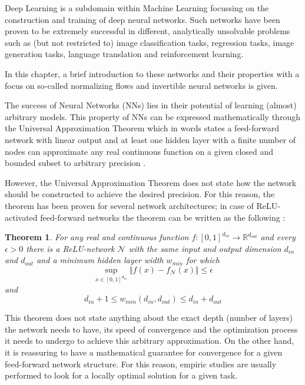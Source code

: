 \label{sec:deeplearning}

Deep Learning is a subdomain within Machine Learning focussing on the construction and training of deep neural networks. Such networks have been proven to be extremely successful in different, analytically unsolvable problems such as (but not restricted to) image classification tasks, regression tasks, image generation tasks, language translation and reinforcement learning.

In this chapter, a brief introduction to these networks and their properties with a focus on so-called normalizing flows and invertible neural networks is given.


The success of Neural Networks (NNs) lies in their potential of learning (almost) arbitrary models. This property of NNs can be expressed mathematically through the Universal Approximation Theorem which in words states a feed-forward network with linear output and at least one hidden layer with a finite number of nodes can approximate any real continuous function on a given closed and bounded subset to arbitrary precision \cite{DLiPR}.

However, the Universal Approximation Theorem does not state how the network should be constructed to achieve the desired precision. For this reason, the theorem has been proven for several network architectures; in case of ReLU-activated feed-forward networks the theorem can be written as the following \cite{UAC}:
\newtheorem{theorem}{Theorem}
\begin{theorem}
	For any real and continuous function $f : [0, 1]^{d_{in}} \rightarrow \mathbb{R}^{d_{out}}$ and every $\epsilon>0$ there is a ReLU-network $\mathcal{N}$ with the same input and output dimension $d_{in}$ and $d_{out}$ and a minimum hidden layer width $w_{min}$ for which
	\begin{equation*}
		\sup_{x\in[0, 1]^{d_{in}}}\Vert f(x)-f_\mathcal{N}(x)\Vert \leq \epsilon
	\end{equation*}
	and
	\begin{equation*}
		d_{in} + 1 \leq w_{min}(d_{in}, d_{out}) \leq d_{in} + d_{out}
	\end{equation*}
\end{theorem}
This theorem does not state anything about the exact depth (number of layers) the network needs to have, its speed of convergence and the optimization process it needs to undergo to achieve this arbitrary approximation. On the other hand, it is reassuring to have a mathematical guarantee for convergence for a given feed-forward network structure. For this reason, empiric studies are usually performed to look for a locally optimal solution for a given task.

